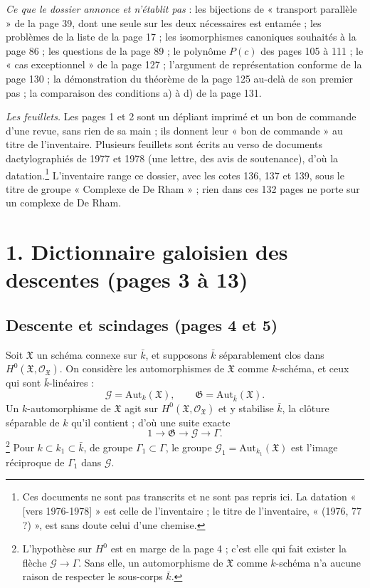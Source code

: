 \documentclass[11pt,a4paper]{article}
\begin{document}
\emph{Ce que le dossier annonce et n'établit pas} : les bijections de
« transport parallèle » de la page 39, dont une seule sur les deux nécessaires
est entamée ; les problèmes de la liste de la page 17 ; les isomorphismes
canoniques souhaités à la page 86 ; les questions de la page 89 ; le polynôme
$P(c)$ des pages 105 à 111 ; le « cas exceptionnel » de la page 127 ;
l'argument de représentation conforme de la page 130 ; la démonstration du
théorème de la page 125 au-delà de son premier pas ; la comparaison des
conditions a) à d) de la page 131.

\emph{Les feuillets.} Les pages 1 et 2 sont un dépliant imprimé et un bon de
commande d'une revue, sans rien de sa main ; ils donnent leur « bon de
commande » au titre de l'inventaire. Plusieurs feuillets sont écrits au verso
de documents dactylographiés de 1977 et 1978 (une lettre, des avis de
soutenance), d'où la datation.\footnote{Ces documents ne sont pas transcrits
et ne sont pas repris ici. La datation « [vers 1976-1978] » est celle de
l'inventaire ; le titre de l'inventaire, « (1976, 77 ?) », est sans doute
celui d'une chemise.} L'inventaire range ce dossier, avec les cotes 136, 137 et
139, sous le titre de groupe « Complexe de De Rham » ; rien dans ces 132 pages
ne porte sur un complexe de De Rham.

\section*{1. Dictionnaire galoisien des descentes (pages 3 à 13)}

\subsection*{Descente et scindages (pages 4 et 5)}

Soit $\mathfrak{X}$ un schéma connexe sur $\bar{k}$, et supposons $\bar{k}$
séparablement clos dans $H^{0}(\mathfrak{X}, \mathcal{O}_{\mathfrak{X}})$. On
considère les automorphismes de $\mathfrak{X}$ comme $k$-schéma, et ceux qui sont
$\bar{k}$-linéaires :
\[
\mathcal{G} = \mathrm{Aut}_{k}(\mathfrak{X}), \qquad
\mathfrak{G} = \mathrm{Aut}_{\bar{k}}(\mathfrak{X}).
\]
Un $k$-automorphisme de $\mathfrak{X}$ agit sur $H^{0}(\mathfrak{X},
\mathcal{O}_{\mathfrak{X}})$ et y stabilise $\bar{k}$, la clôture séparable de
$k$ qu'il contient ; d'où une suite exacte
\[
1 \to \mathfrak{G} \to \mathcal{G} \to \Gamma .
\]
\footnote{L'hypothèse sur $H^{0}$ est en marge de la page 4 ; c'est elle qui
fait exister la flèche $\mathcal{G} \to \Gamma$. Sans elle, un automorphisme
de $\mathfrak{X}$ comme $k$-schéma n'a aucune raison de respecter le
sous-corps $\bar{k}$.}
Pour $k \subset k_{1} \subset \bar{k}$, de groupe $\Gamma_{1} \subset \Gamma$, le
groupe $\mathcal{G}_{1} = \mathrm{Aut}_{k_{1}}(\mathfrak{X})$ est l'image
réciproque de $\Gamma_{1}$ dans $\mathcal{G}$.
\end{document}
